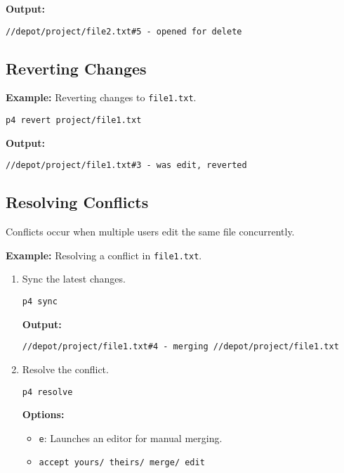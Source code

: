 \documentclass{article}
\begin{document}
\textbf{Output:}

\begin{verbatim}
//depot/project/file2.txt#5 - opened for delete
\end{verbatim}

\subsection{Reverting Changes}

\textbf{Example:} Reverting changes to \texttt{file1.txt}.

\begin{lstlisting}[style=bash]
p4 revert project/file1.txt
\end{lstlisting}

\textbf{Output:}

\begin{verbatim}
//depot/project/file1.txt#3 - was edit, reverted
\end{verbatim}

\subsection{Resolving Conflicts}

Conflicts occur when multiple users edit the same file concurrently.

\textbf{Example:} Resolving a conflict in \texttt{file1.txt}.

\begin{enumerate}
    \item Sync the latest changes.

\begin{lstlisting}[style=bash]
p4 sync
\end{lstlisting}

    \textbf{Output:}

\begin{verbatim}
//depot/project/file1.txt#4 - merging //depot/project/file1.txt
\end{verbatim}

    \item Resolve the conflict.

\begin{lstlisting}[style=bash]
p4 resolve
\end{lstlisting}

    \textbf{Options:}
    \begin{itemize}
        \item \texttt{e}: Launches an editor for manual merging.
        \item \texttt{accept yours/ theirs/ merge/ edit}
    \end{itemize}
\end{enumerate}
\end{document}

